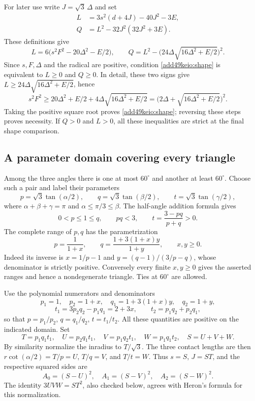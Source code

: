 \documentclass[11pt,a4paper]{article}
\numberwithin{equation}{section}
\theoremstyle{definition}
\theoremstyle{remark}
\begin{document}
For later use write $J=\sqrt3\,\Delta$ and set
\begin{align}
 L&=3s^2(d+4J)-40J^2-3E,\label{add49keio:Ldef}\\
 Q&=L^2-32J^2(32J^2+3E).\label{add49keio:Qdef}
\end{align}
These definitions give
\[
 L=6\bigl(s^2F^2-20\Delta^2-E/2\bigr),\qquad
 Q=L^2-\bigl(24\Delta\sqrt{16\Delta^2+E/2}\bigr)^2.
\]
Since $s,F,\Delta$ and the radical are positive, condition
\eqref{add49keio:shape} is equivalent to $L\ge0$ and $Q\ge0$.
In detail, these two signs give
$L\ge24\Delta\sqrt{16\Delta^2+E/2}$, hence
\[
 s^2F^2\ge
 20\Delta^2+E/2+4\Delta\sqrt{16\Delta^2+E/2}
 =\bigl(2\Delta+\sqrt{16\Delta^2+E/2}\bigr)^2.
\]
Taking the positive square root proves \eqref{add49keio:shape}; reversing these
steps proves necessity.  If $Q>0$ and $L>0$, all these inequalities are
strict at the final shape comparison.

\subsection{A parameter domain covering every triangle}

Among the three angles there is one at most $60^\circ$ and another at
least $60^\circ$. Choose such a pair and label their parameters
\[
 p=\sqrt3\tan(\alpha/2),\qquad
 q=\sqrt3\tan(\beta/2),\qquad
 t=\sqrt3\tan(\gamma/2),
\]
where $\alpha+\beta+\gamma=\pi$ and $\alpha\le\pi/3\le\beta$.
The half-angle addition formula gives
\[
 0<p\le1\le q,\qquad pq<3,\qquad
 t=\frac{3-pq}{p+q}>0.
\]
The complete range of $p,q$ has the parametrization
\begin{equation}\label{add49keio:param}
 p=\frac1{1+x},\qquad
 q=\frac{1+3(1+x)y}{1+y},\qquad x,y\ge0.
\end{equation}
Indeed its inverse is
$x=1/p-1$ and $y=(q-1)/(3/p-q)$, whose denominator is strictly
positive. Conversely every finite $x,y\ge0$ gives the asserted ranges
and hence a nondegenerate triangle. Ties at $60^\circ$ are allowed.

Use the polynomial numerators and denominators
\[
 p_1=1,\quad p_2=1+x,\quad q_1=1+3(1+x)y,\quad q_2=1+y,
\]
\[
 t_1=3p_2q_2-p_1q_1=2+3x,\qquad
 t_2=p_1q_2+p_2q_1,
\]
so that $p=p_1/p_2$, $q=q_1/q_2$, $t=t_1/t_2$.
All these quantities are positive on the indicated domain. Set
\begin{equation}\label{add49keio:contact}
 T=p_1q_1t_1,\quad
 U=p_2q_1t_1,\quad V=p_1q_2t_1,\quad W=p_1q_1t_2,
 \quad S=U+V+W.
\end{equation}
By similarity normalize the inradius to $T/\sqrt3$.
The three contact lengths are then
$r\cot(\alpha/2)=T/p=U$, $T/q=V$, and $T/t=W$.
Thus $s=S$, $J=ST$, and the respective squared sides are
\[
 A_0=(S-U)^2,\quad A_1=(S-V)^2,\quad A_2=(S-W)^2.
\]
The identity $3UVW=ST^2$, also checked below, agrees with Heron's
formula for this normalization.
\end{document}
